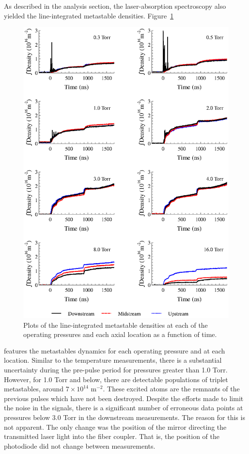 As described in the analysis section, the laser-absorption spectroscopy also
yielded the line-integrated metastable densities. Figure~\ref{fig:metastables}
\begin{figure}
  \centering
  \includegraphics{./chapters/metastables/figures/metastables.eps}
  \caption{Plots of the line-integrated metastable densities at each of
  the operating pressures and each axial location as a function of
  time.}
  \label{fig:metastables}
\end{figure}
features the metastables dynamics for each operating pressure and at each
location. Similar to the temperature measurements, there is a substantial
uncertainty during the pre-pulse period for pressures greater than 1.0 Torr.
However, for 1.0 Torr and below, there are detectable populations of triplet
metastables, around $7\times10^{14}$ m$^{-2}$. These excited atoms are the
remnants of the previous pulses which have not been destroyed. Despite the
efforts made to limit the noise in the signals, there is a significant number of
erroneous data points at pressures below 3.0 Torr in the downstream
measurements. The reason for this is not apparent. The only change was the
position of the mirror directing the transmitted laser light into the fiber
coupler. That is, the position of the photodiode did not change between
measurements. 

